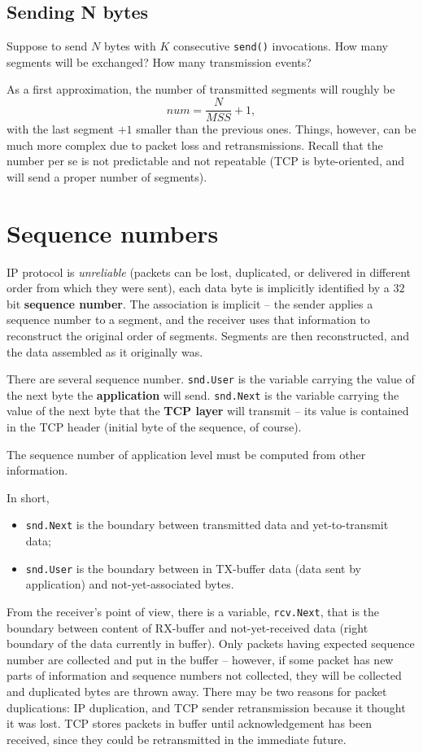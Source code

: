 \documentclass[a4paper, 11pt]{report}
\begin{document}
\subsection{Sending N bytes}

Suppose to send $N$ bytes with $K$ consecutive \texttt{send()} invocations. How
many segments will be exchanged? How many transmission events?

As a first approximation, the number of transmitted segments will roughly be
$$num = \frac{N}{MSS} + 1,$$ with the last segment $+1$ smaller than the
previous ones. Things, however, can be much more complex due to packet loss and
retransmissions. Recall that the number per se is not predictable and not
repeatable (TCP is byte-oriented, and will send a proper number of segments).

\section{Sequence numbers}

IP protocol is \emph{unreliable} (packets can be lost, duplicated, or delivered
in different order from which they were sent), each data byte is implicitly
identified by a $32$ bit \textbf{sequence number}. The association is implicit
\--- the sender applies a sequence number to a segment, and the receiver uses
that information to reconstruct the original order of segments. Segments are
then reconstructed, and the data assembled as it originally was.

There are several sequence number. \texttt{snd.User} is the variable carrying
the value of the next byte the \textbf{application} will send.
\texttt{snd.Next} is the variable carrying the value of the next byte that the
\textbf{TCP layer} will transmit \--- its value is contained in the TCP header
(initial byte of the sequence, of course).

The sequence number of application level must be computed from other
information.

In short,

\begin{itemize}
	\item \texttt{snd.Next} is the boundary between transmitted data and
		yet-to-transmit data;
	\item \texttt{snd.User} is the boundary between in TX-buffer data (data
		sent by application) and not-yet-associated bytes.
\end{itemize}

From the receiver's point of view, there is a variable, \texttt{rcv.Next}, that
is the boundary between content of RX-buffer and not-yet-received data (right
boundary of the data currently in buffer). Only packets having expected
sequence number are collected and put in the buffer \--- however, if some
packet has new parts of information and sequence numbers not collected, they
will be collected and duplicated bytes are thrown away. There may be two
reasons for packet duplications: IP duplication, and TCP sender retransmission
because it thought it was lost. TCP stores packets in buffer until
acknowledgement has been received, since they could be retransmitted in the
immediate future.
\end{document}
